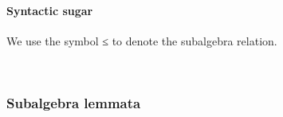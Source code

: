 \paragraph{Syntactic sugar}\label{syntactic-sugar}

We use the symbol ≤ to denote the subalgebra relation.
\ccpad
\begin{code}%
\>[0]\AgdaSpace{}%
\AgdaSymbol{:}\AgdaSpace{}%
\AgdaSymbol{\{}\AgdaSpace{}%
\AgdaSpace{}%
\AgdaSymbol{:}\AgdaSpace{}%
\AgdaSymbol{\}(}\AgdaSpace{}%
\AgdaSymbol{:}\AgdaSpace{}%
\AgdaSpace{}%
\AgdaSpace{}%
\AgdaSymbol{)(}\AgdaSpace{}%
\AgdaSymbol{:}\AgdaSpace{}%
\AgdaSpace{}%
\AgdaSpace{}%
\AgdaSymbol{)}\AgdaSpace{}%
\AgdaSpace{}%
\AgdaSpace{}%
\AgdaSpace{}%
\AgdaSpace{}%
\AgdaSpace{}%
\AgdaSpace{}%
\AgdaSpace{}%
\AgdaSpace{}%
\<%
\\
\>[0]\AgdaSpace{}%
\AgdaSpace{}%
\AgdaSpace{}%
\AgdaSymbol{=}\AgdaSpace{}%
\AgdaSpace{}%
\AgdaSpace{}%
\<%
\end{code}

\subsubsection{Subalgebra lemmata}\label{subalgebra-lemmata}

